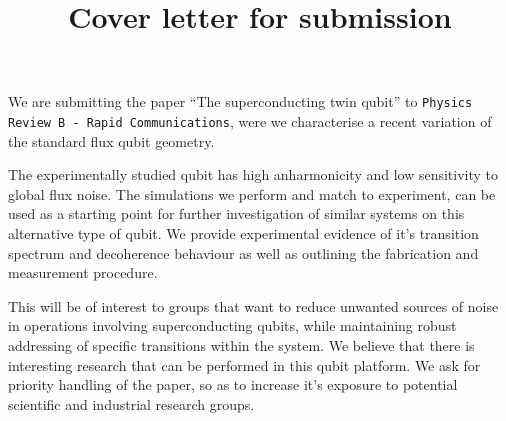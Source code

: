 \documentclass[%
superscriptaddress,
preprint,
preprintnumbers,
bibnotes,
amsmath,
amssymb,
aps,
showkeys,
prb,
]{revtex4-2}
\begin{document}
\title{Cover letter for submission}

\maketitle

\noindent We are submitting the paper ``The superconducting twin qubit'' to \texttt{Physics Review B - Rapid Communications}, were we characterise a recent variation of the standard flux qubit geometry.

The experimentally studied qubit has high anharmonicity and low sensitivity to global flux noise. The simulations we perform and match to experiment, can be used as a starting point for further investigation of similar systems on this alternative type of qubit. We provide experimental evidence of it's transition spectrum and decoherence behaviour as well as outlining the fabrication and measurement procedure.

This will be of interest to groups that want to reduce unwanted sources of noise in operations involving superconducting qubits, while maintaining robust addressing of specific transitions within the system. We believe that there is interesting research that can be performed in this qubit platform. We ask for priority handling of the paper, so as to increase it's exposure to potential scientific and industrial research groups.
\end{document}
